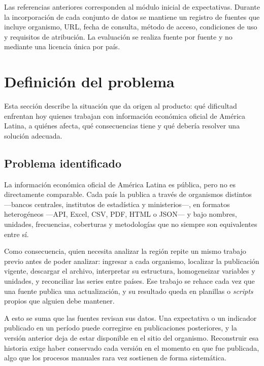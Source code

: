 \documentclass[11pt,a4paper]{article}
\begin{document}
Las referencias anteriores corresponden al m\'odulo inicial de expectativas.
Durante la incorporaci\'on de cada conjunto de datos se mantiene un registro de
fuentes que incluye organismo, URL, fecha de consulta, m\'etodo de acceso,
condiciones de uso y requisitos de atribuci\'on. La evaluaci\'on se realiza
fuente por fuente y no mediante una licencia \'unica por pa\'is.

\section{Definici\'on del problema}

Esta secci\'on describe la situaci\'on que da origen al producto: qu\'e
dificultad enfrentan hoy quienes trabajan con informaci\'on econ\'omica oficial
de Am\'erica Latina, a qui\'enes afecta, qu\'e consecuencias tiene y qu\'e
deber\'ia resolver una soluci\'on adecuada.

\subsection{Problema identificado}

La informaci\'on econ\'omica oficial de Am\'erica Latina es p\'ublica, pero no
es directamente comparable. Cada pa\'is la publica a trav\'es de organismos
distintos ---bancos centrales, institutos de estad\'istica y ministerios---, en
formatos heterog\'eneos ---API, Excel, CSV, PDF, HTML o JSON--- y bajo nombres,
unidades, frecuencias, coberturas y metodolog\'ias que no siempre son
equivalentes entre s\'i.

Como consecuencia, quien necesita analizar la regi\'on repite un mismo trabajo
previo antes de poder analizar: ingresar a cada organismo, localizar la
publicaci\'on vigente, descargar el archivo, interpretar su estructura,
homogeneizar variables y unidades, y reconciliar las series entre pa\'ises. Ese
trabajo se rehace cada vez que una fuente publica una actualizaci\'on, y su
resultado queda en planillas o \emph{scripts} propios que alguien debe
mantener.

A esto se suma que las fuentes revisan sus datos. Una expectativa o un
indicador publicado en un per\'iodo puede corregirse en publicaciones
posteriores, y la versi\'on anterior deja de estar disponible en el sitio del
organismo. Reconstruir esa historia exige haber conservado cada versi\'on en el
momento en que fue publicada, algo que los procesos manuales rara vez sostienen
de forma sistem\'atica.
\end{document}
